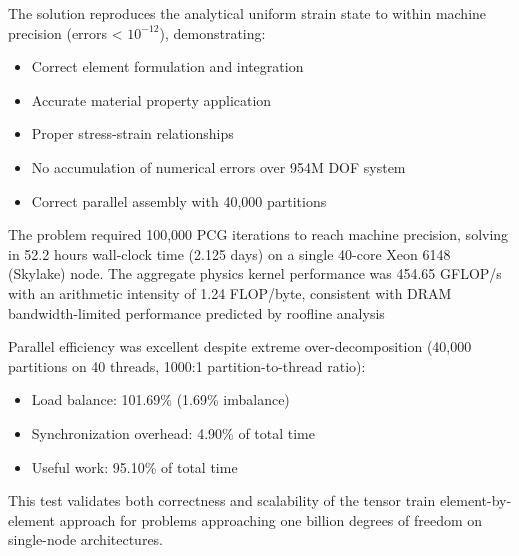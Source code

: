 \documentclass[]             %
{NASA}                       %
\begin{document}
The solution reproduces the analytical uniform strain state to within
machine precision (errors < $10^{-12}$), demonstrating:
\begin{itemize}
\item Correct element formulation and integration
\item Accurate material property application  
\item Proper stress-strain relationships
\item No accumulation of numerical errors over 954M DOF system
\item Correct parallel assembly with 40,000 partitions
\end{itemize}

The problem required 100,000 PCG iterations to reach machine precision,
solving in 52.2 hours wall-clock time (2.125 days) on a single 40-core
Xeon 6148 (Skylake) node. The aggregate physics kernel performance was
454.65 GFLOP/s with an arithmetic intensity of 1.24 FLOP/byte, consistent
with DRAM bandwidth-limited performance predicted by roofline analysis

Parallel efficiency was excellent despite extreme over-decomposition
(40,000 partitions on 40 threads, 1000:1 partition-to-thread ratio):
\begin{itemize}
\item Load balance: 101.69\% (1.69\% imbalance)
\item Synchronization overhead: 4.90\% of total time
\item Useful work: 95.10\% of total time
\end{itemize}

This test validates both correctness and scalability of the tensor train
element-by-element approach for problems approaching one billion degrees
of freedom on single-node architectures.


{}
\end{document}
